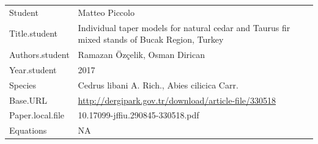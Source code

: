 \documentclass[]{article}
\begin{document}
\begin{longtable}[]{@{}ll@{}}
\toprule
\endhead
\begin{minipage}[t]{0.21\columnwidth}\raggedright
Student\strut
\end{minipage} & \begin{minipage}[t]{0.73\columnwidth}\raggedright
Matteo Piccolo\strut
\end{minipage}\tabularnewline
\begin{minipage}[t]{0.21\columnwidth}\raggedright
Title.student\strut
\end{minipage} & \begin{minipage}[t]{0.73\columnwidth}\raggedright
Individual taper models for natural cedar and Taurus fir mixed stands of
Bucak Region, Turkey\strut
\end{minipage}\tabularnewline
\begin{minipage}[t]{0.21\columnwidth}\raggedright
Authors.student\strut
\end{minipage} & \begin{minipage}[t]{0.73\columnwidth}\raggedright
Ramazan Özçelik, Osman Dirican\strut
\end{minipage}\tabularnewline
\begin{minipage}[t]{0.21\columnwidth}\raggedright
Year.student\strut
\end{minipage} & \begin{minipage}[t]{0.73\columnwidth}\raggedright
2017\strut
\end{minipage}\tabularnewline
\begin{minipage}[t]{0.21\columnwidth}\raggedright
Species\strut
\end{minipage} & \begin{minipage}[t]{0.73\columnwidth}\raggedright
Cedrus libani A. Rich., Abies cilicica Carr.\strut
\end{minipage}\tabularnewline
\begin{minipage}[t]{0.21\columnwidth}\raggedright
Base.URL\strut
\end{minipage} & \begin{minipage}[t]{0.73\columnwidth}\raggedright
\url{http://dergipark.gov.tr/download/article-file/330518}\strut
\end{minipage}\tabularnewline
\begin{minipage}[t]{0.21\columnwidth}\raggedright
Paper.local.file\strut
\end{minipage} & \begin{minipage}[t]{0.73\columnwidth}\raggedright
10.17099-jffiu.290845-330518.pdf\strut
\end{minipage}\tabularnewline
\begin{minipage}[t]{0.21\columnwidth}\raggedright
Equations\strut
\end{minipage} & \begin{minipage}[t]{0.73\columnwidth}\raggedright
NA\strut
\end{minipage}\tabularnewline
\bottomrule
\end{longtable}
\end{document}
